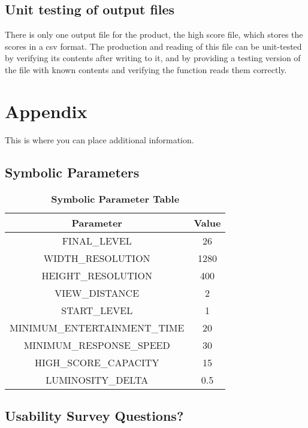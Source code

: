 \documentclass[12pt, titlepage]{article}
\begin{document}
	\subsection{Unit testing of output files}
		There is only one output file for the product, the high score file, which stores the scores in a csv format. The production and reading of this file can be unit-tested by verifying its contents after writing to it, and by providing a testing version of the file with known contents and verifying the function reads them correctly.

% 

% 

\newpage

\section{Appendix}

	This is where you can place additional information.

	\subsection{Symbolic Parameters}

		\begin{table}[h!]
			\centering
			\caption{\textbf{Symbolic Parameter Table}}
			\label{symbolicParameters}
			\bigskip
			\def\arraystretch{1.6}


			\begin{tabular}{| c | c |}
				\bottomrule
				\textbf{Parameter} & \textbf{Value} \\
				\hline
				FINAL\_LEVEL & 26 \\
				WIDTH\_RESOLUTION & 1280 \\
				HEIGHT\_RESOLUTION & 400 \\
				VIEW\_DISTANCE & 2 \\
				START\_LEVEL & 1 \\
				MINIMUM\_ENTERTAINMENT\_TIME & 20 \\
				MINIMUM\_RESPONSE\_SPEED & 30 \\
				HIGH\_SCORE\_CAPACITY & 15 \\
				LUMINOSITY\_DELTA & 0.5 \\
				\toprule
			\end{tabular}
		\end{table}

\subsection{Usability Survey Questions?}
\end{document}
